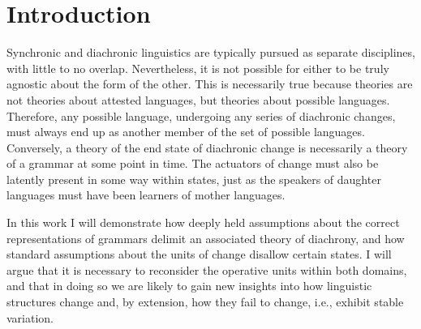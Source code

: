 \chapter{Introduction}

Synchronic and diachronic linguistics are typically pursued as separate
disciplines, with little to no overlap. Nevertheless, it is not possible
for either to be truly agnostic about the form of the other. This
is necessarily true because  theories are not theories about
attested languages, but theories about possible languages. Therefore,
any possible language, undergoing any series of diachronic changes,
must always end up as another member of the set of possible 
languages. Conversely, a theory of the end state of diachronic change
is necessarily a theory of a  grammar at some point in time.
The actuators of change must also be latently present in some way
within  states, just as the speakers of daughter languages
must have been learners of mother languages.

In this work I will demonstrate how deeply held assumptions about
the correct representations of  grammars delimit an associated
theory of diachrony, and how standard assumptions about the units
of change disallow certain  states. I will argue that it
is necessary to reconsider the operative units within both domains,
and that in doing so we are likely to gain new insights into how linguistic
structures change and, by extension, how they fail to change, i.e.,
exhibit stable variation.

